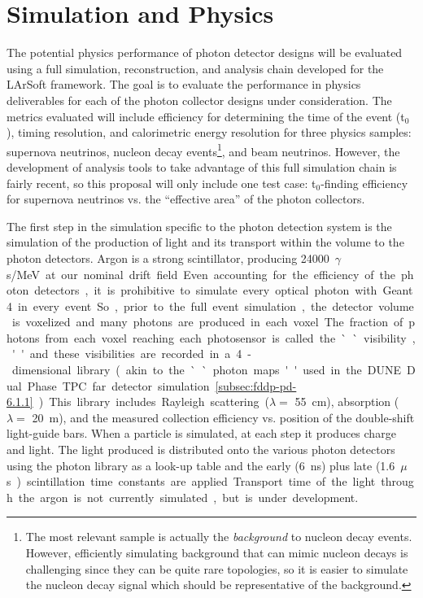 \section{Simulation and Physics}
\label{sec:fdsp-pd-simphys}

The potential physics performance of photon detector designs will be evaluated using a full simulation, reconstruction, and analysis chain developed for the LArSoft framework. The goal is to evaluate the performance in physics deliverables for each of the photon collector designs under consideration. The metrics evaluated will include efficiency for determining the time of the event (t$_0$), timing resolution, and calorimetric energy resolution for three physics samples: supernova neutrinos, nucleon decay events\footnote{The most relevant sample is actually the \emph{background} to nucleon decay events. However, efficiently simulating background that can mimic nucleon decays is challenging since they can be quite rare topologies, so it is easier to simulate the nucleon decay signal which should be representative of the background.}, and beam neutrinos. However, the development of analysis tools to take advantage of this full simulation chain is fairly recent, so this proposal will only include one test case: t$_0$-finding efficiency for supernova neutrinos vs. the ``effective area'' of the photon collectors.

The first step in the simulation specific to the photon detection system is the simulation of the production of light and its transport within the volume to the photon detectors. Argon is a strong scintillator, producing \SI{24000}{$\gamma$s/MeV} at our nominal drift field. Even accounting for the efficiency of the photon detectors, it is prohibitive to simulate every optical photon with Geant4 in every event. So, prior to the full event simulation, the detector volume is voxelized and many photons are produced in each voxel. The fraction of photons from each voxel reaching each photosensor is called the ``visibility,'' and these visibilities are recorded in a 4-dimensional library (akin to the ``photon maps'' used in the DUNE Dual Phase TPC far detector simulation\ref{subsec:fddp-pd-6.1.1}). This library includes Rayleigh scattering ($\lambda=$ \SI{55}{cm}), absorption ($\lambda=$ \SI{20}{m}), and the measured collection efficiency vs. position of the double-shift light-guide bars. When a particle is simulated, at each step it produces charge and light. The light produced is distributed onto the various photon detectors using the photon library as a look-up table and the early (\SI{6}{ns}) plus late (\SI{1.6}{$\mu$s}) scintillation time constants are applied. Transport time of the light through the argon is not currently simulated, but is under development.


